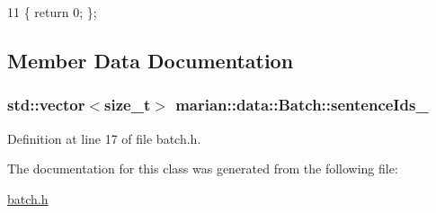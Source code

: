 \begin{DoxyCode}
11 \{ \textcolor{keywordflow}{return} 0; \};
\end{DoxyCode}


\subsection{Member Data Documentation}
\subsubsection[{\texorpdfstring{sentence\+Ids\+\_\+}{sentenceIds_}}]{\setlength{\rightskip}{0pt plus 5cm}std\+::vector$<$size\+\_\+t$>$ marian\+::data\+::\+Batch\+::sentence\+Ids\+\_\+\hspace{0.3cm}{\ttfamily [protected]}}\hypertarget{classmarian_1_1data_1_1Batch_aeaa5d26797761e4e0abbe56cf2d89c3a}{}\label{classmarian_1_1data_1_1Batch_aeaa5d26797761e4e0abbe56cf2d89c3a}


Definition at line 17 of file batch.\+h.



The documentation for this class was generated from the following file\+:\begin{DoxyCompactItemize}
\item 
\hyperlink{batch_8h}{batch.\+h}\end{DoxyCompactItemize}
